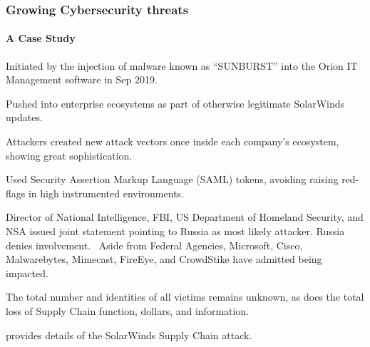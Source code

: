 \begin{frame}
  \frametitle{Growing Cybersecurity threats}
  \framesubtitle{A Case Study}
  \begin{itemize}
          \scriptsize{
    \item Initiated by the injection of malware known as ``SUNBURST'' into the Orion IT Management software in Sep 2019.
    \item Pushed into enterprise ecosystems as part of otherwise legitimate SolarWinds updates.
    \item Attackers created new attack vectors once inside each company's ecosystem, showing great sophistication.
    \item Used Security Assertion Markup Language (SAML) tokens, avoiding raising red-flags in high instrumented environments.
    \item Director of National Intelligence, FBI, US Department of Homeland Security, and NSA issued joint statement pointing to Russia as most likely attacker. Russia denies involvement.
    \ Aside from Federal Agencies, Microsoft, Cisco, Malwarebytes, Mimecast, FireEye, and CrowdStike have admitted being impacted.
    \item The total number and identities of all victims remains unknown, as does the total loss of Supply Chain function, dollars, and information.
}


           {\scriptsize{\textcite{growleyNavigatingSolarWindsSupply2021} provides details of the SolarWinds Supply Chain attack.}}

  \end{itemize}
\end{frame}
